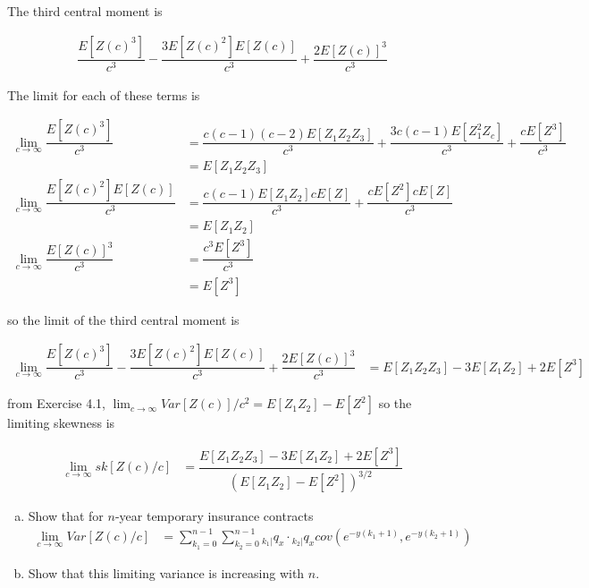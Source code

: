 \documentclass[12pt]{article}
\numberwithin{questioncounter}{section}
\begin{document}
\begin{solution}
The third central moment is

\begin{align*}
\dfrac{E[Z(c)^{3}]}{c^3} - \dfrac{3E[Z(c)^2]E[Z(c)]}{c^3} + \dfrac{2E[Z(c)]^{3}}{c^3}
\end{align*}

The limit for each of these terms is

\begin{align*}
\lim_{c\to \infty} \dfrac{E[Z(c)^3]}{c^3} &= \dfrac{c(c-1)(c-2)E[Z_{1}Z_{2}Z_{3}]}{c^3} + \dfrac{3c(c-1)E[Z_{1}^{2}Z_{c}]}{c^3} + \dfrac{cE[Z^{3}]}{c^3} \\
&= E[Z_{1}Z_{2}Z_{3}] \\
\lim_{c \to \infty} \dfrac{E[Z(c)^2]E[Z(c)]}{c^3} &= \dfrac{c(c-1)E[Z_{1}Z_{2}]cE[Z]}{c^3} + \dfrac{cE[Z^{2}]cE[Z]}{c^3} \\
&= E[Z_{1}Z_{2}] \\
\lim_{c\to \infty} \dfrac{E[Z(c)]^{3}}{c^3} &= \dfrac{c^{3}E[Z^{3}]}{c^3} \\
&= E[Z^{3}]
\end{align*}

so the limit of the third central moment is

\begin{align*}
\lim_{c \to \infty} \dfrac{E[Z(c)^{3}]}{c^3} - \dfrac{3E[Z(c)^2]E[Z(c)]}{c^3} + \dfrac{2E[Z(c)]^{3}}{c^3} &= E[Z_{1}Z_{2}Z_{3}] - 3E[Z_{1}Z_{2}] + 2E[Z^3]  
\end{align*}

from Exercise 4.1, $\lim_{c\to \infty} Var[Z(c)]/c^2 = E[Z_{1}Z_{2}] - E[Z^{2}]$ so the limiting skewness is

\begin{align*}
\lim_{c\to \infty} sk[Z(c)/c] &= \dfrac{E[Z_{1}Z_{2}Z_{3}] - 3E[Z_{1}Z_{2}] + 2E[Z^3]}{(E[Z_{1}Z_{2}] - E[Z^{2}])^{3/2}}
\end{align*}

\end{solution}

\begin{question}
\begin{enumerate}[(a)]
\item Show that for $n$-year temporary insurance contracts
%
\begin{align*}
\lim_{c \to \infty} Var[Z(c)/c] &= \sum_{k_{1} = 0}^{n-1} \sum_{k_{2} = 0}^{n-1} {}_{k_{1}|}q_{x} \cdot {}_{k_{2}|}q_{x} cov(e^{-y(k_{1} + 1)}, e^{-y(k_{2} + 1)})
\end{align*}

\item Show that this limiting variance is increasing with $n$.

\end{enumerate}
\end{question}
\end{document}
